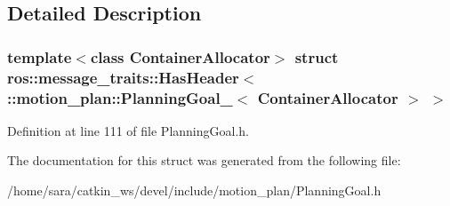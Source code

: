 \subsection{Detailed Description}
\subsubsection*{template$<$class Container\+Allocator$>$\newline
struct ros\+::message\+\_\+traits\+::\+Has\+Header$<$ \+::motion\+\_\+plan\+::\+Planning\+Goal\+\_\+$<$ Container\+Allocator $>$ $>$}



Definition at line 111 of file Planning\+Goal.\+h.



The documentation for this struct was generated from the following file\+:\begin{DoxyCompactItemize}
\item 
/home/sara/catkin\+\_\+ws/devel/include/motion\+\_\+plan/Planning\+Goal.\+h\end{DoxyCompactItemize}
